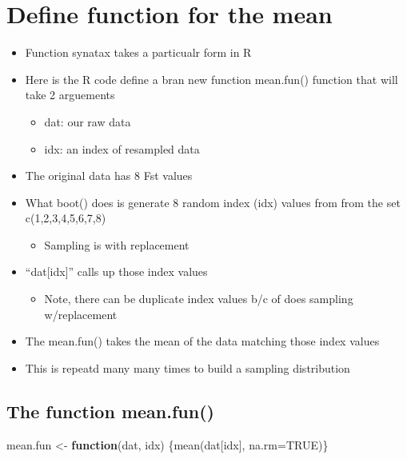 \documentclass[
]{book}
\newenvironment{Shaded}{\begin{snugshade}}{\end{snugshade}}
\newcommand{\AttributeTok}[1]{\textcolor[rgb]{0.77,0.63,0.00}{#1}}
\newcommand{\ConstantTok}[1]{\textcolor[rgb]{0.00,0.00,0.00}{#1}}
\newcommand{\ControlFlowTok}[1]{\textcolor[rgb]{0.13,0.29,0.53}{\textbf{#1}}}
\newcommand{\FunctionTok}[1]{\textcolor[rgb]{0.00,0.00,0.00}{#1}}
\newcommand{\NormalTok}[1]{#1}
\newcommand{\OtherTok}[1]{\textcolor[rgb]{0.56,0.35,0.01}{#1}}
\providecommand{\tightlist}{%
  \setlength{\itemsep}{0pt}\setlength{\parskip}{0pt}}
\begin{document}
\hypertarget{define-function-for-the-mean}{%
\section{Define function for the mean}\label{define-function-for-the-mean}}

\begin{itemize}
\tightlist
\item
  Function synatax takes a particualr form in R
\item
  Here is the R code define a bran new function mean.fun() function that will take 2 arguements

  \begin{itemize}
  \tightlist
  \item
    dat: our raw data
  \item
    idx: an index of resampled data
  \end{itemize}
\item
  The original data has 8 Fst values
\item
  What boot() does is generate 8 random index (idx) values from from the set c(1,2,3,4,5,6,7,8)

  \begin{itemize}
  \tightlist
  \item
    Sampling is with replacement
  \end{itemize}
\item
  ``dat{[}idx{]}'' calls up those index values

  \begin{itemize}
  \tightlist
  \item
    Note, there can be duplicate index values b/c of does sampling w/replacement
  \end{itemize}
\item
  The mean.fun() takes the mean of the data matching those index values
\item
  This is repeatd many many times to build a sampling distribution
\end{itemize}

\hypertarget{the-function-mean.fun}{%
\subsection{The function mean.fun()}\label{the-function-mean.fun}}

\begin{Shaded}
\begin{Highlighting}[]
\NormalTok{mean.fun }\OtherTok{\textless{}{-}} \ControlFlowTok{function}\NormalTok{(dat, idx) \{}\FunctionTok{mean}\NormalTok{(dat[idx], }\AttributeTok{na.rm=}\ConstantTok{TRUE}\NormalTok{)\}}
\end{Highlighting}
\end{Shaded}
\end{document}
